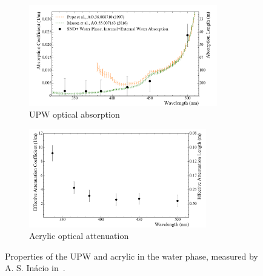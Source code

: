 \begin{figure}
    \centering
    \begin{subfigure}{0.98\textwidth}
        \centering
        \includegraphics[width=0.9\textwidth]{2_Detector/Figs/WaterAbsorption.png}
        \caption{UPW optical absorption}
        \label{fig:abs_length_water_optics_paper}
    \end{subfigure}
    \begin{subfigure}{0.98\textwidth}
        \centering
        \includegraphics[width=0.85\textwidth]{2_Detector/Figs/AcrylicAttenuation.png}
        \caption{Acrylic optical attenuation}
        \label{fig:abs_length_acylic_optics_paper}
    \end{subfigure}
    \caption[Measured properties of the UPW and acrylic in the water phase.]
    {Properties of the UPW and acrylic in the water phase, measured by A. S. In\'{a}cio in~\cite{andersonOpticalCalibrationSNO2021,inacioDataAnalysisWater2022}.}
    \label{fig:abs_lengths_optics_paper}
\end{figure}

